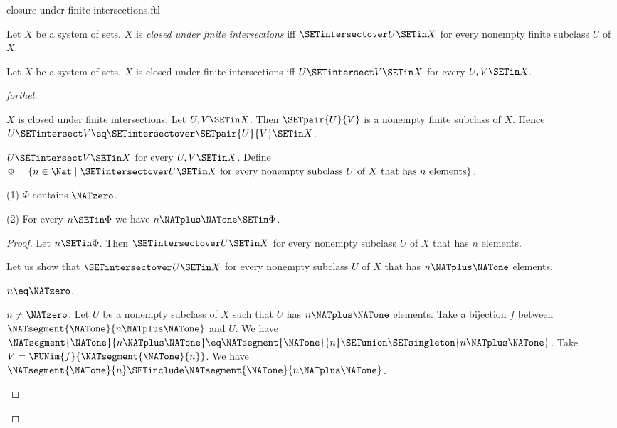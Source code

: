 \documentclass{naproche-library}
\begin{document}
\begin{smodule}[title=Closure Under Finite Intersections]{closure-under-finite-intersections.ftl}

\begin{definition}[forthel,id=FOUNDATIONS_14_4297814324543488]
  Let $X$ be a system of sets.
  $X$ is \emph{closed under finite intersections} iff $\SETintersectover U \SETin X$ for every nonempty finite subclass $U$ of $X$.
\end{definition}

\begin{proposition}[forthel,id=FOUNDATIONS_17_1405012582334464]
  Let $X$ be a system of sets.
  $X$ is closed under finite intersections iff $U \SETintersect V \SETin X$ for every $U, V \SETin X$.
\end{proposition}
\begin{proof}[forthel]
  \begin{case}{$X$ is closed under finite intersections.}
    Let $U, V \SETin X$.
    Then $\SETpair{U}{V}$ is a nonempty finite subclass of $X$.
    Hence $U \SETintersect V \eq \SETintersectover \SETpair{U}{V} \SETin X$.
  \end{case}

  \begin{case}{$U \SETintersect V \SETin X$ for every $U, V \SETin X$.}
    Define $\Phi = \{ n \in \Nat \mid \SETintersectover U \SETin X\text{ for every nonempty subclass }U\text{ of }X\text{ that has }n\text{ elements}\}$.

    (1) $\Phi$ contains $\NATzero$.

    (2) For every $n \SETin \Phi$ we have $n \NATplus \NATone \SETin \Phi$.
    \begin{proof}
      Let $n \SETin \Phi$.
      Then $\SETintersectover U \SETin X$ for every nonempty subclass $U$ of $X$ that has $n$ elements.

      Let us show that $\SETintersectover U \SETin X$ for every nonempty subclass $U$ of $X$ that has $n \NATplus \NATone$ elements.

        \begin{case}{$n \eq \NATzero$.} \end{case}

        \begin{case}{$n \neq \NATzero$.}
          Let $U$ be a nonempty subclass of $X$ such that $U$ has $n \NATplus \NATone$ elements.
          Take a bijection $f$ between $\NATsegment{\NATone}{n \NATplus \NATone}$ and $U$.
          We have $\NATsegment{\NATone}{n \NATplus \NATone} \eq \NATsegment{\NATone}{n} \SETunion \SETsingleton{n \NATplus \NATone}$.
          Take $V = \FUNim{f}{\NATsegment{\NATone}{n}}$.
          We have $\NATsegment{\NATone}{n} \SETinclude \NATsegment{\NATone}{n \NATplus \NATone}$.


\end{case}
\end{proof}
\end{case}
\end{proof}
\end{smodule}
\end{document}
